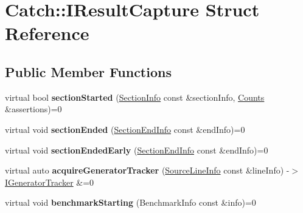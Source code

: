 \hypertarget{structCatch_1_1IResultCapture}{}\section{Catch\+::I\+Result\+Capture Struct Reference}
\label{structCatch_1_1IResultCapture}
\subsection*{Public Member Functions}
\begin{DoxyCompactItemize}
\item 
\mbox{\label{structCatch_1_1IResultCapture_a5b76ed52badcb64cf374202e12b81a03}} 
virtual bool {\bfseries section\+Started} (\mbox{\hyperlink{structCatch_1_1SectionInfo}{Section\+Info}} const \&section\+Info, \mbox{\hyperlink{structCatch_1_1Counts}{Counts}} \&assertions)=0
\item 
\mbox{\label{structCatch_1_1IResultCapture_a4e152bc43dc0933684e31fa67a58195d}} 
virtual void {\bfseries section\+Ended} (\mbox{\hyperlink{structCatch_1_1SectionEndInfo}{Section\+End\+Info}} const \&end\+Info)=0
\item 
\mbox{\label{structCatch_1_1IResultCapture_afcc71eef8ca821ae132cced4a2be6988}} 
virtual void {\bfseries section\+Ended\+Early} (\mbox{\hyperlink{structCatch_1_1SectionEndInfo}{Section\+End\+Info}} const \&end\+Info)=0
\item 
\mbox{\label{structCatch_1_1IResultCapture_ab020d111e29ad1cabe1227dcfda712ef}} 
virtual auto {\bfseries acquire\+Generator\+Tracker} (\mbox{\hyperlink{structCatch_1_1SourceLineInfo}{Source\+Line\+Info}} const \&line\+Info) -\/$>$ \mbox{\hyperlink{structCatch_1_1IGeneratorTracker}{I\+Generator\+Tracker}} \&=0
\item 
\mbox{\label{structCatch_1_1IResultCapture_a264ae12330c74b2daae41715a30d51bf}} 
virtual void {\bfseries benchmark\+Starting} (Benchmark\+Info const \&info)=0
\item 
\mbox{\label{structCatch_1_1IResultCapture_a6e5e64f9d94211a888249012ab6cc7fb}} 

\end{DoxyCompactItemize}
